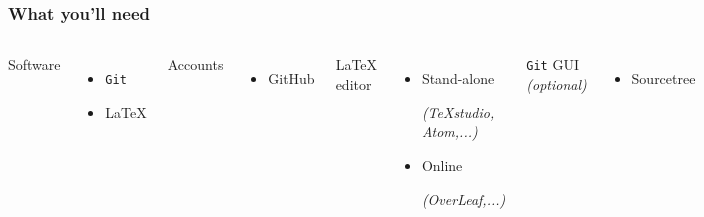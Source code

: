 \documentclass{beamer}
\begin{document}
\begin{frame}
    \frametitle{What you'll need}

\begin{columns}


Software
    \begin{itemize}
        \item \texttt{Git}
        \item \LaTeX
    \end{itemize}
Accounts
    \begin{itemize}
        \item GitHub\footnotemark
    \end{itemize}

\LaTeX{} editor
    \begin{itemize}
        \item Stand-alone {\tiny \emph{(TeXstudio, Atom,...)} \par}
        \item Online {\tiny \emph{(OverLeaf,...)} \par}
    \end{itemize}
\texttt{Git} GUI \emph{(optional)}
    \begin{itemize}
        \item Sourcetree
    \end{itemize}

   \begin{figure}
    \centering
    \includegraphics[width = 0.9\textwidth]{figs/phd101212s.png}
  \end{figure}
\end{columns}
\end{frame}
\end{document}
